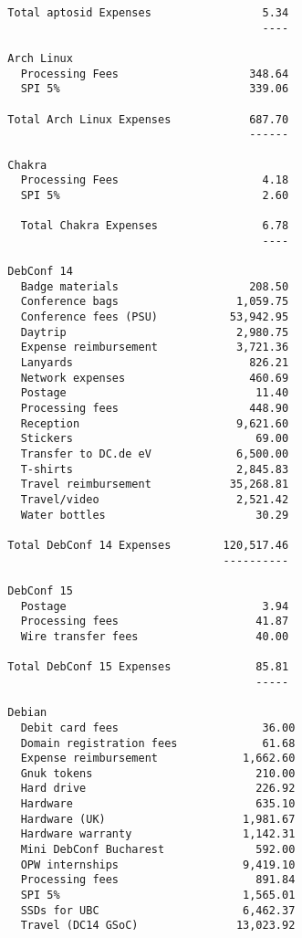 \documentclass[letterpaper]{report}
\begin{document}
\begin{verbatim}
  Total aptosid Expenses                 5.34
                                         ----

  Arch Linux
    Processing Fees                    348.64
    SPI 5%                             339.06

  Total Arch Linux Expenses            687.70
                                       ------

  Chakra
    Processing Fees                      4.18
    SPI 5%                               2.60

    Total Chakra Expenses                6.78
                                         ----

  DebConf 14
    Badge materials                    208.50
    Conference bags                  1,059.75
    Conference fees (PSU)           53,942.95
    Daytrip                          2,980.75
    Expense reimbursement            3,721.36
    Lanyards                           826.21
    Network expenses                   460.69
    Postage                             11.40
    Processing fees                    448.90
    Reception                        9,621.60
    Stickers                            69.00
    Transfer to DC.de eV             6,500.00
    T-shirts                         2,845.83
    Travel reimbursement            35,268.81
    Travel/video                     2,521.42
    Water bottles                       30.29

  Total DebConf 14 Expenses        120,517.46
                                   ----------

  DebConf 15
    Postage                              3.94
    Processing fees                     41.87
    Wire transfer fees                  40.00

  Total DebConf 15 Expenses             85.81
                                        -----

  Debian
    Debit card fees                      36.00
    Domain registration fees             61.68
    Expense reimbursement             1,662.60
    Gnuk tokens                         210.00
    Hard drive                          226.92
    Hardware                            635.10
    Hardware (UK)                     1,981.67
    Hardware warranty                 1,142.31
    Mini DebConf Bucharest              592.00
    OPW internships                   9,419.10
    Processing fees                     891.84
    SPI 5%                            1,565.01
    SSDs for UBC                      6,462.37
    Travel (DC14 GSoC)               13,023.92


\end{verbatim}
\end{document}
